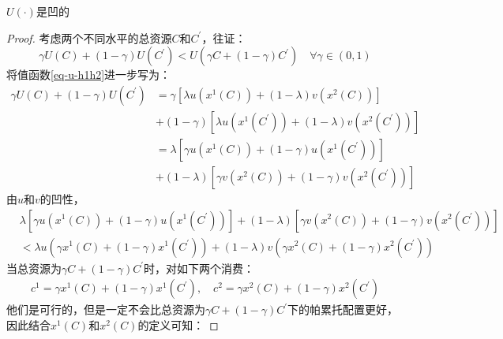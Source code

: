 \begin{property}
    $U\left(\cdot\right)$是凹的
\end{property}
\begin{proof}
    考虑两个不同水平的总资源$C$和$C^{\prime}$，往证：
    \begin{equation*}
        \gamma U(C)+(1-\gamma) U\left(C^{\prime}\right)<U\left(\gamma C+(1-\gamma) C^{\prime}\right) \quad \forall \gamma\in (0,1)
    \end{equation*}
    将值函数\ref{eq-u-h1h2}进一步写为：
    \begin{equation*}
        \begin{aligned}
            \gamma U(C)+(1-\gamma) U\left(C^{\prime}\right)&= \gamma\left[\lambda u\left(x^1(C)\right)+(1-\lambda) v\left(x^2(C)\right)\right] \\
            & +(1-\gamma)\left[\lambda u\left(x^1\left(C^{\prime}\right)\right)+(1-\lambda) v\left(x^2\left(C^{\prime}\right)\right)\right] \\
            &= \lambda\left[\gamma u\left(x^1(C)\right)+(1-\gamma) u\left(x^1\left(C^{\prime}\right)\right)\right] \\
            & +(1-\lambda)\left[\gamma v\left(x^2(C)\right)+(1-\gamma) v\left(x^2\left(C^{\prime}\right)\right)\right]
        \end{aligned}
    \end{equation*}
    由$u$和$v$的凹性，
    \begin{equation*}
        \begin{aligned}
            & \lambda\left[\gamma u\left(x^1(C)\right)+(1-\gamma) u\left(x^1\left(C^{\prime}\right)\right)\right]
                +(1-\lambda)\left[\gamma v\left(x^2(C)\right)+(1-\gamma) v\left(x^2\left(C^{\prime}\right)\right)\right] \\
            & <\lambda u\left(\gamma x^1(C)+(1-\gamma) x^1\left(C^{\prime}\right)\right)
                +(1-\lambda) v\left(\gamma x^2(C)+(1-\gamma) x^2\left(C^{\prime}\right)\right)
        \end{aligned}
    \end{equation*}
    当总资源为$\gamma C+ (1-\gamma)C^{\prime}$时，对如下两个消费：
    \begin{align*}
        c^1 = \gamma x^1(C)+(1-\gamma) x^1\left(C^{\prime}\right), \quad c^2 =\gamma x^2(C)+(1-\gamma) x^2\left(C^{\prime}\right)
    \end{align*}
    他们是可行的，但是一定不会比总资源为$\gamma C+ (1-\gamma)C^{\prime}$下的帕累托配置更好，因此结合$x^1\left(C\right)$和$x^2\left(C\right)$的定义可知：

\end{proof}
